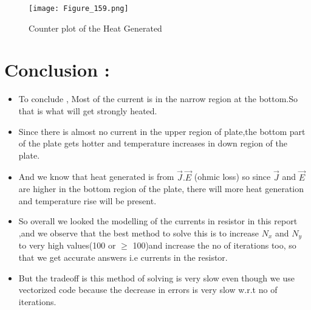 \documentclass[11pt, a4paper, twoside]{article}
\begin{document}
 \begin{figure}[!tbh]
 \centering
 \texttt{[image: Figure\_159.png]}  
 \caption{Counter plot of the Heat Generated}
 \end{figure}
   
\newpage
      
\section*{Conclusion :}\label{results-and-conclusion}
  
  \begin{itemize}
  \item
    To conclude , Most of the current is in the narrow region at the
    bottom.So that is what will get strongly heated.\\
  \item
    Since there is almost no current in the upper region of plate,the
    bottom part of the plate gets hotter and temperature increases in down
    region of the plate.\\
  \item
    And we know that heat generated is from \(\vec{J}.\vec{E}\) (ohmic
    loss) so since \(\vec{J}\) and \(\vec{E}\) are higher in the bottom
    region of the plate, there will more heat generation and temperature
    rise will be present.\\
  \item
    So overall we looked the modelling of the currents in resistor in this
    report ,and we observe that the best method to solve this is to
    increase \(N_x\) and \(N_y\) to very high values(100 or \(\geq\)
    100)and increase the no of iterations too, so that we get accurate
    answers i.e currents in the resistor.\\
  \item
    But the tradeoff is this method of solving is very slow even though we
    use vectorized code because the decrease in errors is very slow w.r.t
    no of iterations.
  \end{itemize}
 
   
\end{document}
